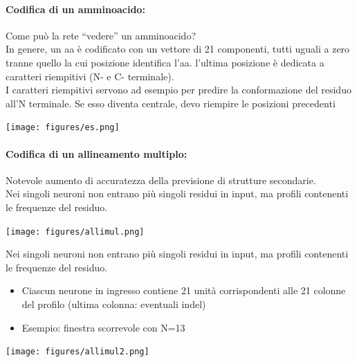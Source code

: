 \documentclass{article}
\begin{document}
\paragraph{Codifica di un amminoacido:} Come può la rete “vedere” un
amminoacido?\\
In genere, un aa è codificato con un vettore di 21 componenti, tutti
uguali a zero tranne quello la cui posizione identifica l'aa. l'ultima
posizione è dedicata a caratteri riempitivi (N- e C- terminale).\\
I caratteri riempitivi servono ad esempio per predire la conformazione del residuo all'N
terminale. Se esso diventa centrale, devo riempire le posizioni precedenti
\begin{center}
    \texttt{[image: figures/es.png]}
\end{center}
\paragraph{Codifica di un allineamento multiplo: }Notevole aumento di
accuratezza della previsione di strutture secondarie.\\
Nei singoli neuroni non entrano più singoli residui in input, ma profili
contenenti le frequenze del residuo.
\begin{center}
    \texttt{[image: figures/allimul.png]}
\end{center}
Nei singoli neuroni non entrano più singoli residui in input, ma profili
contenenti le frequenze del residuo. 
\begin{itemize}
    \item Ciascun neurone
    in ingresso
    contiene 21 unità
    corrispondenti alle
    21 colonne del
    profilo (ultima
    colonna: eventuali
    indel)
    \item Esempio: finestra scorrevole con N=13
\end{itemize}
\begin{center}
    \texttt{[image: figures/allimul2.png]}
\end{center}
\end{document}
